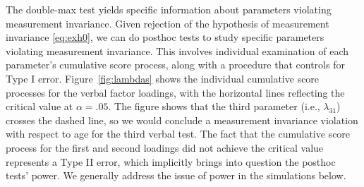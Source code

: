 \documentclass[man]{apa}
\begin{document}
The double-max test yields specific information about 
parameters violating measurement invariance.  Given
rejection of the hypothesis of measurement invariance \eqref{eq:exh0},
we can do posthoc 
tests to study specific parameters violating measurement invariance.
This involves individual examination of each parameter's cumulative
score process,
along with a procedure that controls for Type I error.  
Figure~\ref{fig:lambdas} shows the individual cumulative score processes for the
verbal factor loadings, with the horizontal lines reflecting the
critical value at $\alpha=.05$.
  The figure
shows that the third parameter (i.e., $\lambda_{31}$) crosses the
dashed line, so we would conclude a measurement 
invariance violation with respect to age for the third
verbal test.  The fact that the cumulative score process for the first
and second loadings did not achieve the critical value represents a Type II
error, which implicitly brings into question the posthoc tests' power.  We
generally address the issue of power in the simulations below.
\end{document}
